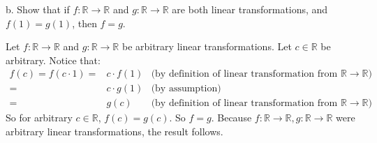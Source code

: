 \documentclass[12pt]{article}
\newenvironment{problem}[2][Problem]
{
	\begin{trivlist} 
		\item[\hskip \labelsep {\bfseries #1 #2:}]
	}
{
	\end{trivlist}
	}
\newenvironment{solution}[1][Solution]
{
	\begin{trivlist} 
		\item[\hskip \labelsep {\itshape #1:}]
	}
	{
	\end{trivlist}
}
\begin{document}
\begin{problem}{3}
\begin{solution}
\end{solution}
\noindent
\newline
\newline
b. Show that if $f : \mathbb{R} \to \mathbb{R}$ and $g : \mathbb{R} \to \mathbb{R}$ are both linear transformations, and $f(1)=g(1)$, then $f=g$.
\begin{solution}
Let $f : \mathbb{R} \to \mathbb{R}$ and $g : \mathbb{R} \to \mathbb{R}$ be arbitrary linear transformations. Let $c \in \mathbb{R}$ be arbitrary. Notice that:
\begin{align*}
f(c) = f(c \cdot 1) =& c\cdot f(1) & \text{(by definition of linear transformation from $\mathbb{R} \to \mathbb{R}$)}\\
=& c \cdot g(1) &\text{(by assumption)}\\
=& g(c) & \text{(by definition of linear transformation from $\mathbb{R} \to \mathbb{R}$)}
\end{align*}
So for arbitrary $c \in \mathbb{R}$, $f(c) = g(c)$. So $f=g$. Because $f : \mathbb{R} \to \mathbb{R}, g: \mathbb{R} \to \mathbb{R}$ were arbitrary linear transformations, the result follows.
\end{solution}
\end{problem}
\end{document}

